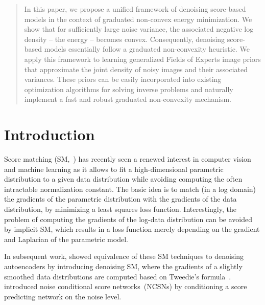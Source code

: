 \documentclass{article}
\theoremstyle{plain}
\theoremstyle{definition}
\theoremstyle{remark}
\begin{document}
\printAffiliationsAndNotice{}  %

\begin{abstract}
In this paper, we propose a unified framework of denoising score-based models in the context of graduated non-convex energy minimization.
We show that for sufficiently large noise variance, the associated negative log density -- the energy -- becomes convex. Consequently, denoising score-based models essentially follow a graduated non-convexity heuristic.
We apply this framework to learning generalized Fields of Experts image priors that approximate the joint density of noisy images and their associated variances.
These priors can be easily incorporated into existing optimization algorithms for solving inverse problems and naturally implement a fast and robust graduated non-convexity mechanism.
\end{abstract}

\section{Introduction}


Score matching (SM,~\citealp{Hy05}) has recently seen a renewed interest in computer vision and machine learning as it allows to fit a high-dimensional parametric distribution to a given data distribution while avoiding computing the often intractable normalization constant. The basic idea is to match (in a log domain) the gradients of the parametric distribution with the gradients of the data distribution, by minimizing a least squares loss function. Interestingly, the problem of computing the gradients of the log-data distribution can be avoided by implicit SM, which results in a loss function merely depending on the gradient and Laplacian of the parametric model.

In subsequent work, \citet{Vi11} showed equivalence of these SM techniques to denoising autoencoders by introducing denoising SM, where the gradients of a slightly smoothed data distributions are computed based on Tweedie's formula~\cite{Ef11}.
\citet{SoEr19,SoEr20} introduced noise conditional score networks~(NCSNs) by conditioning a score predicting network on the noise level.
\end{document}
